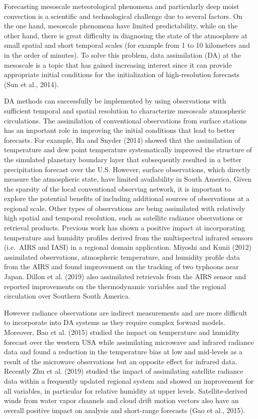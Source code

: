 \documentclass[final,5p,times,twocolumn,authoryear]{elsarticle} %
\begin{document}
Forecasting mesoscale meteorological phenomena and particularly deep moist convection is a scientific and technological challenge due to several factors.
On the one hand, mesoscale phenomena have limited predictability, while on the other hand, there is great difficulty in diagnosing the state of the atmosphere at small spatial and short temporal scales (for example from 1 to 10 kilometers and in the order of minutes).
To solve this problem, data assimilation (DA) at the mesoscale is a topic that has gained increasing interest since it can provide appropriate initial conditions for the initialization of high-resolution forecasts (Sun et al., 2014).

DA methods can successfully be implemented by using observations with sufficient temporal and spatial resolution to characterize mesoscale atmospheric circulations.
The assimilation of conventional observations from surface stations has an important role in improving the initial conditions that lead to better forecasts.
For example, Ha and Snyder (2014) showed that the assimilation of temperature and dew point temperature systematically improved the structure of the simulated planetary boundary layer that subsequently resulted in a better precipitation forecast over the U.S.
However, surface observations, which directly measure the atmospheric state, have limited availability in South America. Given the sparsity of the local conventional observing network, it is important to explore the potential benefits of including additional sources of observations at a regional scale.
Other types of observations are being assimilated with relatively high spatial and temporal resolution, such as satellite radiance observations or retrieval products.
Previous work has shown a positive impact at incorporating temperature and humidity profiles derived from the multispectral infrared sensors (i.e.~AIRS and IASI) in a regional domain application.
Miyoshi and Kunii (2012) assimilated observations, atmospheric temperature, and humidity profile data from the AIRS and found improvement on the tracking of two typhoons near Japan.
Dillon et al. (2019) also assimilated retrievals from the AIRS sensor and reported improvements on the thermodynamic variables and the regional circulation over Southern South America.

However radiance observations are indirect measurements and are more difficult to incorporate into DA systems as they require complex forward models. Moreover, Bao et al. (2015) studied the impact on temperature and humidity forecast over the western USA while assimilating microwave and infrared radiance data and found a reduction in the temperature bias at low and mid-levels as a result of the microwave observations but an opposite effect for infrared data. Recently Zhu et al. (2019) studied the impact of assimilating satellite radiance data within a frequently updated regional system and showed an improvement for all variables, in particular for relative humidity at upper levels.
Satellite-derived winds from water vapor channels and cloud drift motion vectors also have an overall positive impact on analysis and short-range forecasts (Gao et al., 2015).
\end{document}
